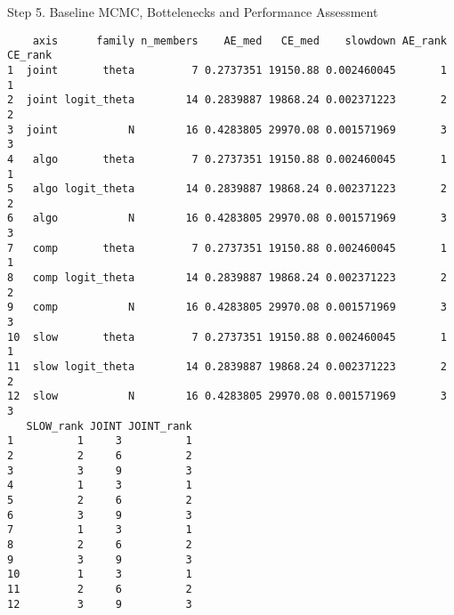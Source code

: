 \documentclass[
  10pt,
  ignorenonframetext,
  aspectratio=169]{beamer}
\begin{document}
\begin{frame}[fragile]{Step 5. Baseline MCMC, Bottelenecks and
Performance Assessment}
\begin{lstlisting}
    axis      family n_members    AE_med   CE_med    slowdown AE_rank CE_rank
1  joint       theta         7 0.2737351 19150.88 0.002460045       1       1
2  joint logit_theta        14 0.2839887 19868.24 0.002371223       2       2
3  joint           N        16 0.4283805 29970.08 0.001571969       3       3
4   algo       theta         7 0.2737351 19150.88 0.002460045       1       1
5   algo logit_theta        14 0.2839887 19868.24 0.002371223       2       2
6   algo           N        16 0.4283805 29970.08 0.001571969       3       3
7   comp       theta         7 0.2737351 19150.88 0.002460045       1       1
8   comp logit_theta        14 0.2839887 19868.24 0.002371223       2       2
9   comp           N        16 0.4283805 29970.08 0.001571969       3       3
10  slow       theta         7 0.2737351 19150.88 0.002460045       1       1
11  slow logit_theta        14 0.2839887 19868.24 0.002371223       2       2
12  slow           N        16 0.4283805 29970.08 0.001571969       3       3
   SLOW_rank JOINT JOINT_rank
1          1     3          1
2          2     6          2
3          3     9          3
4          1     3          1
5          2     6          2
6          3     9          3
7          1     3          1
8          2     6          2
9          3     9          3
10         1     3          1
11         2     6          2
12         3     9          3
\end{lstlisting}
\end{frame}
\end{document}
